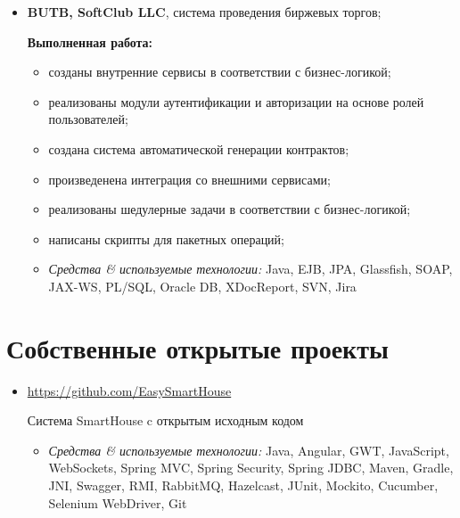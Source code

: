 \documentclass[a4paper, 12pt]{article}
\newcommand{\position}[1]{
    \textbf{#1}}
\newcommand{\itemlabel}[1]{
    \textit{#1:}}
\begin{document}
            \begin{itemize}
        \item \position{BUTB, SoftClub LLC}, система проведения биржевых торгов;

            \textbf{Выполненная работа:}
			\begin{itemize}
  				\item созданы внутренние сервисы в соответствии с бизнес-логикой;
  				\item реализованы модули аутентификации и авторизации на основе ролей пользователей;
  				\item создана система автоматической генерации контрактов;
  				\item произведенена интеграция со внешними сервисами;
  				\item реализованы шедулерные задачи в соответствии с бизнес-логикой;
  				\item написаны скрипты для пакетных операций;
			\end{itemize}
	
            \begin{itemize}
                \item \itemlabel{Средства \& используемые технологии} Java, EJB, JPA, Glassfish, SOAP, JAX-WS, PL/SQL, Oracle DB, XDocReport, SVN, Jira
            \end{itemize}
    \end{itemize}

      
\section*{Собственные открытые проекты}  

  
    \begin{itemize}
        \item \href{https://github.com/EasySmartHouse}{https://github.com/EasySmartHouse}

Система SmartHouse c открытым исходным кодом 
                        
            \begin{itemize}
                \item \itemlabel{Средства \& используемые технологии} Java, Angular, GWT, JavaScript, WebSockets, Spring MVC, Spring Security, Spring JDBC, Maven, Gradle, JNI, Swagger, RMI, RabbitMQ, Hazelcast, JUnit, Mockito, Cucumber, Selenium WebDriver, Git
            \end{itemize}
     \end{itemize}
            
\end{document}
